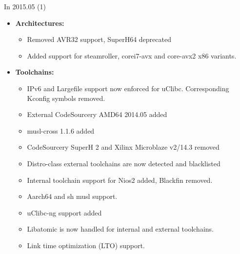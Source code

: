 \begin{frame}{In 2015.05 (1)}
  \begin{itemize}
  \item {\bf Architectures:}
    \begin{itemize}
    \item Removed AVR32 support, SuperH64 deprecated
    \item Added support for steamroller, corei7-avx and core-avx2 x86
      variants.
    \end{itemize}
  \item {\bf Toolchains:}
    \begin{itemize}
    \item IPv6 and Largefile support now enforced for
      uClibc. Corresponding Kconfig symbols removed.
    \item External CodeSourcery AMD64 2014.05 added
    \item musl-cross 1.1.6 added
    \item CodeSourcery SuperH 2 and Xilinx Microblaze v2/14.3 removed
    \item Distro-class external toolchains are now detected and
      blacklisted
    \item Internal toolchain support for Nios2 added, Blackfin
      removed.
    \item Aarch64 and sh musl support.
    \item uClibc-ng support added
    \item Libatomic is now handled for internal and external
      toolchains.
    \item Link time optimization (LTO) support.
    \end{itemize}
  \end{itemize}
\end{frame}

